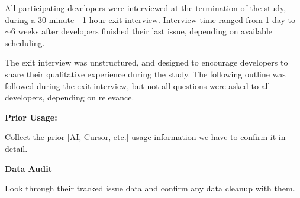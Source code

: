 \documentclass{article}
\begin{document}
All participating developers were interviewed at the termination of the study, during a 30 minute - 1 hour exit interview. Interview time ranged from 1 day to $\sim6$ weeks after developers finished their last issue, depending on available scheduling. 

The exit interview was unstructured, and designed to encourage developers to share their qualitative experience during the study. The following outline was followed during the exit interview, but not all questions were asked to all developers, depending on relevance.

\begin{instructionbox}

\textbf{Prior Usage:}

Collect the prior [AI, Cursor, etc.] usage information we have to confirm it in detail.

\textbf{Data Audit}

Look through their tracked issue data and confirm any data cleanup with them.


\end{instructionbox}
\end{document}
